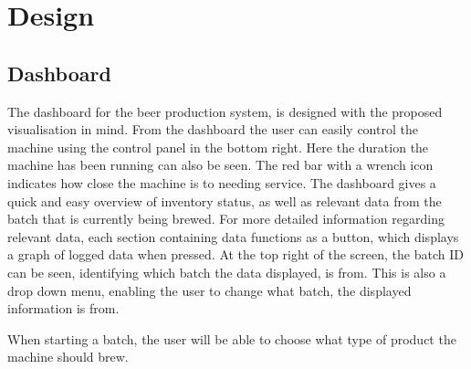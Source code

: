 \section{Design}

\subsection{Dashboard}
The dashboard for the beer production system, is designed with
the proposed visualisation in mind. From the dashboard the user can easily
control the machine using the control panel in the bottom right. Here the
duration the machine has been running can also be seen. The red bar with a
wrench icon indicates how close the machine is to needing service. The dashboard
gives a quick and easy overview of inventory status, as well as relevant data
from the batch that is currently being brewed. For more detailed information
regarding relevant data, each section containing data functions as a button,
which displays a graph of logged data when pressed. At the top right of the
screen, the batch ID can be seen, identifying which batch the data displayed,
is from. This is also a drop down menu, enabling the user to change what batch,
the displayed information is from.

When starting a batch, the user will be able to choose what type of product the
machine should brew.